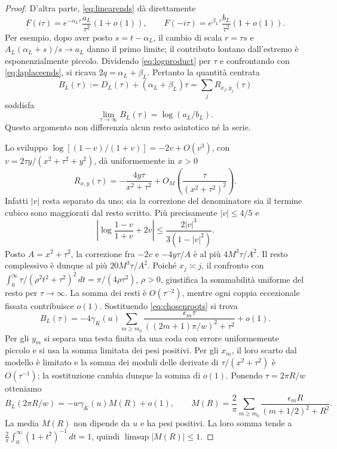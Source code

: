 \documentclass[11pt,a4paper]{article}
\theoremstyle{remark}
\begin{document}
\begin{proof}
D'altra parte, \eqref{eq:linearends} dà direttamente
\begin{equation}\label{eq:laplaceends}
F(i\tau)=e^{-\alpha_L\tau}\frac{a_L}{\tau^2}(1+o(1)),\qquad
F(-i\tau)=e^{\beta_L\tau}\frac{b_L}{\tau^2}(1+o(1)).
\end{equation}
Per esempio, dopo aver posto $s=t-\alpha_L$, il cambio di scala
$r=\tau s$ e $A_L(\alpha_L+s)/s\to a_L$ danno il primo limite;
il contributo lontano dall'estremo è esponenzialmente piccolo.
Dividendo \eqref{eq:logproduct} per $\tau$ e confrontando con
\eqref{eq:laplaceends}, si ricava $2q=\alpha_L+\beta_L$.
Pertanto la quantità centrata
\begin{equation}\label{eq:centeredlog}
B_L(\tau):=D_L(\tau)+(\alpha_L+\beta_L)\tau
=\sum_j R_{x_j,y_j}(\tau)
\end{equation}
soddisfa
\begin{equation}\label{eq:laplaceJ}
\lim_{\tau\to\infty}B_L(\tau)=\log(a_L/b_L).
\end{equation}
Questo argomento non differenzia alcun resto asintotico né la serie.

Lo sviluppo $\log[(1-v)/(1+v)]=-2v+O(v^3)$, con
$v=2\tau y/(x^2+\tau^2+y^2)$, dà uniformemente in $x>0$
\begin{equation}\label{eq:kernel}
R_{x,y}(\tau)=-\frac{4y\tau}{x^2+\tau^2}
+O_M\left(\frac{\tau}{(x^2+\tau^2)^2}\right).
\end{equation}
Infatti $|v|$ resta separato da uno; sia la correzione del denominatore
sia il termine cubico sono maggiorati dal resto scritto.
Più precisamente $|v|\leq4/5$ e
\[
\left|\log\frac{1-v}{1+v}+2v\right|
\leq\frac{2|v|^3}{3(1-|v|^2)}.
\]
Posto $A=x^2+\tau^2$, la correzione fra $-2v$ e $-4y\tau/A$
è al più $4M^3\tau/A^2$. Il resto complessivo è dunque al più
$20M^3\tau/A^2$. Poiché $x_j\asymp j$, il confronto con
$\int_0^\infty\tau/(\rho^2t^2+\tau^2)^2\,dt=\pi/(4\rho\tau^2)$, $\rho>0$,
giustifica la sommabilità uniforme del resto per $\tau\to\infty$.
La somma dei resti è $O(\tau^{-2})$, mentre ogni coppia eccezionale
fissata contribuisce $o(1)$. Sostituendo \eqref{eq:chosenroots} si trova
\[
B_L(\tau)=-4\gamma_K(u)\sum_{m\geq m_0}
\frac{\epsilon_m\tau}{((2m+1)\pi/w)^2+\tau^2}+o(1).
\]
Per gli $y_m$ si separa una testa finita da una coda con errore
uniformemente piccolo e si usa la somma limitata dei pesi positivi.
Per gli $x_m$, il loro scarto dal modello è limitato e la somma dei
moduli delle derivate di $\tau/(x^2+\tau^2)$ è $O(\tau^{-1})$;
la sostituzione cambia dunque la somma di $o(1)$.
Ponendo $\tau=2\pi R/w$ otteniamo
\begin{equation}\label{eq:universalmean}
B_L(2\pi R/w)=-w\gamma_K(u)M(R)+o(1),\qquad
M(R)=\frac2\pi\sum_{m\geq m_0}
\frac{\epsilon_m R}{(m+1/2)^2+R^2}.
\end{equation}
La media $M(R)$ non dipende da $u$ e ha pesi positivi. La loro somma
tende a $\frac2\pi\int_0^\infty(1+t^2)^{-1}\,dt=1$, quindi
$\limsup|M(R)|\leq1$.


\end{proof}
\end{document}

